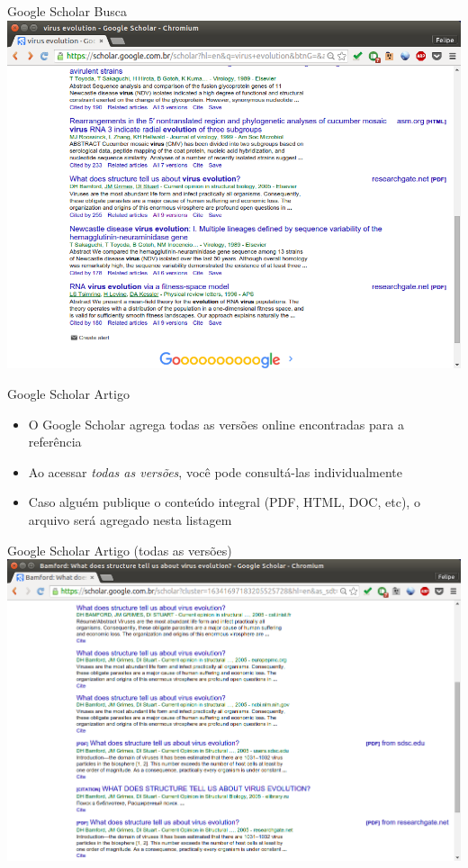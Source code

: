 \documentclass{beamer}
\begin{document}
\begin{frame}{Google Scholar Busca}
  \includegraphics[height=.85\textheight]{Busca/scholar-busca2}
\end{frame}

\begin{frame}{Google Scholar Artigo}
  \begin{itemize}
  \item O Google Scholar agrega todas as versões online encontradas
    para a referência
  \item Ao acessar {\em todas as versões}, você pode consultá-las
    individualmente
  \item Caso alguém publique o conteúdo integral (PDF, HTML, DOC,
    etc), o arquivo será agregado nesta listagem
  \end{itemize}
\end{frame}

\begin{frame}{Google Scholar Artigo (todas as versões)}
  \includegraphics[height=.85\textheight]{Busca/scholar-paper}
\end{frame}
\end{document}
